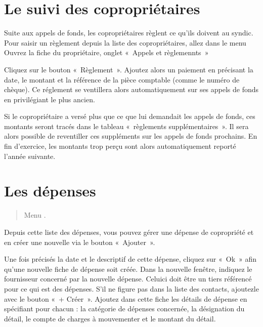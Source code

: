 \documentclass[a4paper,10pt,oneside,french]{sphinxmanual}
\begin{document}
\section{Le suivi des copropriétaires}
\label{\detokenize{condominium/payoff:le-suivi-des-coproprietaires}}\label{\detokenize{condominium/payoff::doc}}
\sphinxAtStartPar
Suite aux appels de fonds, les copropriétaires règlent ce qu’ils doivent au syndic.
Pour saisir un règlement depuis la liste des copropriétaires, allez dans le menu 
Ouvrez la fiche du propriétaire, onglet « Appels et règlemennts »
\begin{quote}

\noindent{}
\end{quote}

\sphinxAtStartPar
Cliquez sur le bouton « Règlement ».
Ajoutez alors un paiement en précisant la date, le montant et la référence de la pièce comptable (comme le numéro de chèque).
Ce réglement se ventillera alors automatiquement sur ses appels de fonds en privilégiant le plus ancien.

\sphinxAtStartPar
Si le copropriétaire a versé plus que ce que lui demandait les appels de fonds, ces montants seront tracés dans le tableau « règlements supplémentaires ».
Il sera alors possible de reventiller ces suppléments sur les appels de fonds prochains.
En fin d’exercice, les montants trop perçu sont alors automatiquement reporté l’année suivante.


\section{Les dépenses}
\label{\detokenize{condominium/expense:les-depenses}}\label{\detokenize{condominium/expense::doc}}\begin{quote}

\sphinxAtStartPar
Menu .
\end{quote}

\sphinxAtStartPar
Depuis cette liste des dépenses, vous pouvez gérer une dépense de copropriété et en créer une nouvelle via le bouton « Ajouter ».

\sphinxAtStartPar
Une fois précisés la date et le descriptif de cette dépense, cliquez sur « Ok » afin qu’une nouvelle fiche de dépense soit créée.
Dans la nouvelle fenêtre, indiquez le fournisseur concerné par la nouvelle dépense. Celui\sphinxhyphen{}ci doit être un tiers référencé pour ce qui est des dépenses. S’il ne figure pas dans la liste des contacts, ajoutez\sphinxhyphen{}le avec le bouton « + Créer ».
Ajoutez dans cette fiche les détails de dépense en spécifiant pour chacun : la catégorie de dépenses concernée, la désignation du détail, le compte de charges à mouvementer et le montant du détail.
\begin{quote}

\noindent{}
\end{quote}
\end{document}
